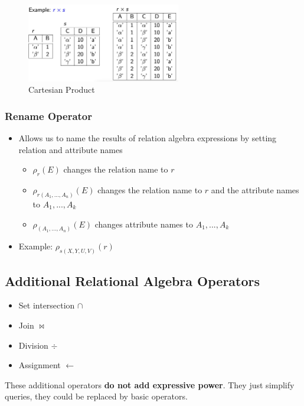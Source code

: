 \begin{figure}[H]
\centering
\includegraphics[width=0.6\textwidth]{images/Screenshot 2024-05-01 at 18.40.41.jpg}
\caption{Cartesian Product}
\end{figure}

\subsubsection{Rename Operator}
\begin{itemize}
    \item Allows us to name the results of relation algebra expressions by setting relation and attribute names
    \begin{itemize}
        \item $\rho_r(E)$ changes the relation name to $r$
        \item $\rho_{r(A_1,...,A_n)}(E)$ changes the relation name to $r$ and the attribute names to $A_1,...,A_k$
        \item $\rho_{(A_1,...,A_n)}(E)$ changes attribute names to $A_1,...,A_k$
    \end{itemize}
    \item Example: $\rho_{s(X,Y,U,V)}(r)$
\end{itemize}

\subsection{Additional Relational Algebra Operators}

\begin{itemize}
    \item Set intersection $\cap$
    \item Join $\bowtie$
    \item Division $\div$
    \item Assignment $\leftarrow$
\end{itemize}

These additional operators \textbf{do not add expressive power}. They just simplify queries, they could be replaced by basic operators.


